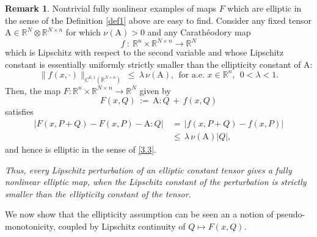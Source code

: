 \documentclass{amsart}
\theoremstyle{definition}
\newtheorem{remark}[theorem]{Remark}
\numberwithin{equation}{section}
\begin{document}
\begin{remark}
Nontrivial fully nonlinear examples of maps $F$ which are elliptic in the sense of the Definition \ref{def1} above are easy to find. Consider any fixed tensor ${\textrm{A}} \in {\mathbb{R}}^N {\otimes} {\mathbb{R}}^{N{\times} n}$ for which $\nu({\textrm{A}})>0$ and any Carath\'eodory map
\[
f\ : \ {\mathbb{R}}^n {\times} {\mathbb{R}}^{N{\times} n}{\longrightarrow} {\mathbb{R}}^N
\]
which is Lipschitz with respect to the second variable and whose Lipschitz constant is essentially uniformly strictly smaller than the ellipticity constant of ${\textrm{A}}$:
\[
\big\|f(x,\cdot)\big\|_{C^{0,1}({\mathbb{R}}^{N{\times} n})} \ \leq\ {\lambda} \, \nu({\textrm{A}}), \ \ \text{for a.e. }x\in {\mathbb{R}}^n, \ \ 0<{\lambda}<1.
\]
Then, the map $F :{\mathbb{R}}^n {\times} {\mathbb{R}}^{N{\times} n}{\longrightarrow} {\mathbb{R}}^N$ given by
\[
F(x, Q)\, :=\, {\textrm{A}}:Q\, +\, f(x, Q)
\]
satisfies
\begin{align}
\Big|F(x,P+Q)-F(x,P)-{\textrm{A}}:Q \Big|\, &=\, \big|f(x,P+Q)-f(x,P) \big| \nonumber\\
&\leq\, {\lambda} \,\nu({\textrm{A}}) |Q|,\nonumber
\end{align}
and hence is elliptic in the sense of \eqref{3.3}. {\medskip}

{\noindent} \textit{Thus, every Lipschitz perturbation of an elliptic constant tensor gives a fully nonlinear elliptic map, when the Lipschitz constant of the perturbation is strictly smaller than the ellipticity constant of the tensor.}

\end{remark}

We now show that the ellipticity assumption can be seen an a notion of pseudo-monotonicity, coupled by Lipschitz continuity of $Q\mapsto F(x,Q)$. 
\end{document}
